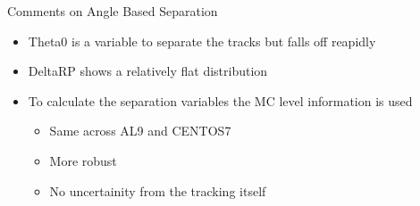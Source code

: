 \begin{frame}{Comments on Angle Based Separation}
	\begin{itemize}
		\item Theta0 is a variable to separate the tracks but falls off reapidly
		\item DeltaRP shows a relatively flat distribution
		\item To calculate the separation variables the MC level information is used
		\begin{itemize}
			\item Same across AL9 and CENTOS7
			\item More robust 
			\item No uncertainity from the tracking itself
		\end{itemize}
	\end{itemize}
\end{frame}